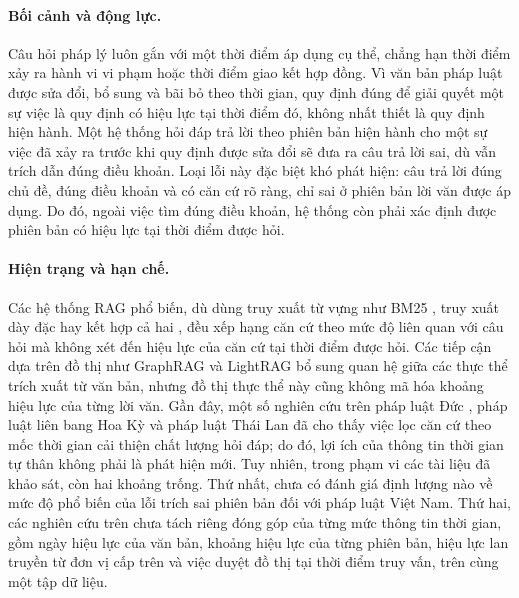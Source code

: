 \documentclass[11pt,a4paper]{article}
\begin{document}
\paragraph{Bối cảnh và động lực.} Câu hỏi pháp lý luôn gắn với một thời điểm áp dụng cụ thể, chẳng hạn thời điểm xảy ra hành vi vi phạm hoặc thời điểm giao kết hợp đồng. Vì văn bản pháp luật được sửa đổi, bổ sung và bãi bỏ theo thời gian, quy định đúng để giải quyết một sự việc là quy định có hiệu lực tại thời điểm đó, không nhất thiết là quy định hiện hành. Một hệ thống hỏi đáp trả lời theo phiên bản hiện hành cho một sự việc đã xảy ra trước khi quy định được sửa đổi sẽ đưa ra câu trả lời sai, dù vẫn trích dẫn đúng điều khoản. Loại lỗi này đặc biệt khó phát hiện: câu trả lời đúng chủ đề, đúng điều khoản và có căn cứ rõ ràng, chỉ sai ở phiên bản lời văn được áp dụng. Do đó, ngoài việc tìm đúng điều khoản, hệ thống còn phải xác định được phiên bản có hiệu lực tại thời điểm được hỏi.

\paragraph{Hiện trạng và hạn chế.} Các hệ thống RAG phổ biến, dù dùng truy xuất từ vựng như BM25 \citep{robertson2009bm25}, truy xuất dày đặc \citep{karpukhin2020dpr} hay kết hợp cả hai \citep{cormack2009rrf}, đều xếp hạng căn cứ theo mức độ liên quan với câu hỏi mà không xét đến hiệu lực của căn cứ tại thời điểm được hỏi. Các tiếp cận dựa trên đồ thị như GraphRAG \citep{edge2024graphrag} và LightRAG \citep{guo2025lightrag} bổ sung quan hệ giữa các thực thể trích xuất từ văn bản, nhưng đồ thị thực thể này cũng không mã hóa khoảng hiệu lực của từng lời văn. Gần đây, một số nghiên cứu trên pháp luật Đức \citep{prior2026oldfriend}, pháp luật liên bang Hoa Kỳ \citep{yao2026lawinforce} và pháp luật Thái Lan \citep{akarajaradwong2026nitibenchplus} đã cho thấy việc lọc căn cứ theo mốc thời gian cải thiện chất lượng hỏi đáp; do đó, lợi ích của thông tin thời gian tự thân không phải là phát hiện mới. Tuy nhiên, trong phạm vi các tài liệu đã khảo sát, còn hai khoảng trống. Thứ nhất, chưa có đánh giá định lượng nào về mức độ phổ biến của lỗi trích sai phiên bản đối với pháp luật Việt Nam. Thứ hai, các nghiên cứu trên chưa tách riêng đóng góp của từng mức thông tin thời gian, gồm ngày hiệu lực của văn bản, khoảng hiệu lực của từng phiên bản, hiệu lực lan truyền từ đơn vị cấp trên và việc duyệt đồ thị tại thời điểm truy vấn, trên cùng một tập dữ liệu.
\end{document}
